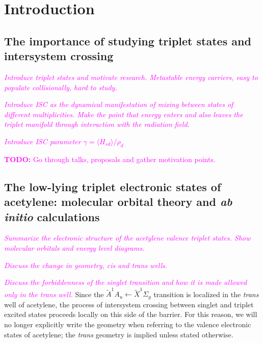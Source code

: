 \message{ !name(chapter1-introduction.tex)}\documentclass[12pt]{mitthesis}
\newcommand{\TODO} [1]{\textcolor{magenta}{\textbf{TODO:} #1}}
\newcommand{\POINT}[1]{\textcolor{magenta}{\emph{#1}}}
\begin{document}

\tableofcontents
\clearpage

\chapter{Introduction}

\section{The importance of studying triplet states and intersystem
  crossing}

\POINT{Introduce triplet states and motivate research. Metastable
  energy carriers, easy to populate collisionally, hard to study.}

\POINT{Introduce ISC as the dynamical manifestation of mixing between
  states of different multiplicities. Make the point that energy
  enters and also leaves the triplet manifold through interaction with
  the radiation field.}

\POINT{Introduce ISC parameter $\gamma = \langle H_{sd} \rangle /
  \rho_d$}

\TODO{Go through talks, proposals and gather motivation points.}

\section{The low-lying triplet electronic states of acetylene:
  molecular orbital theory and \emph{ab initio} calculations}

\POINT{Summarize the electronic structure of the acetylene valence
  triplet states.  Show molecular orbitals and energy level diagrams.}

\POINT{Discuss the change in geometry, cis and trans wells.}  

\POINT{Discuss the forbiddenness of the singlet transition and how it
  is made allowed only in the \emph{trans} well.}  Since the
$\tilde{A}^1A_u \leftarrow \tilde{X}^1\Sigma_g$ transition is
localized in the \emph{trans} well of acetylene, the process of
intersystem crossing between singlet and triplet excited states
proceeds locally on this side of the barrier.  For this reason, we
will no longer explicitly write the geometry when referring to the
valence electronic states of acetylene; the \emph{trans} geometry is
implied unless stated otherwise.
\end{document}
